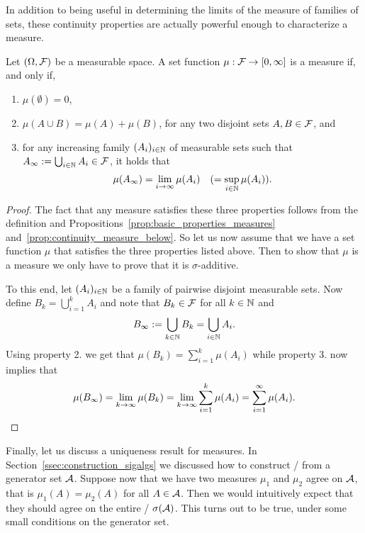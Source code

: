 In addition to being useful in determining the limits of the measure of families of sets, these continuity properties are actually powerful enough to characterize a measure. 

\begin{theorem}
Let $(\Omega, \mathcal F)$ be a measurable space. A set function $\mu : \mathcal F \to [0,\infty]$ is a measure if, and only if,
\begin{enumerate}
\item $\mu(\emptyset) = 0$,
\item $\mu(A \cup B) = \mu(A) + \mu(B)$, for any two disjoint sets $A, B \in \mathcal F$, and
\item for any increasing family $(A_i)_{i \in \mathbb N}$ of measurable sets such that $A_\infty := \bigcup_{i \in \mathbb N} A_i \in \mathcal F$, it holds that
\[
	\mu(A_\infty) = \lim_{i \to \infty} \mu(A_i) \quad (= \sup_{i \in \mathbb N} \mu(A_i)).
\]
\end{enumerate}
\end{theorem}

\begin{proof}
The fact that any measure satisfies these three properties follows from the definition and Propositions~\ref{prop:basic_properties_measures} and~\ref{prop:continuity_measure_below}. So let us now assume that we have a set function $\mu$ that satisfies the three properties listed above. Then to show that $\mu$ is a measure we only have to prove that it is $\sigma$-additive.

To this end, let $(A_i)_{i \in \mathbb N}$ be a family of pairwise disjoint measurable sets. Now define $B_k = \bigcup_{i = 1}^k A_i$ and note that $B_k \in \mathcal F$ for all $k \in \mathbb N$ and
\[
	B_\infty := \bigcup_{k \in \mathbb N} B_k = \bigcup_{i \in \mathbb N} A_i.
\]
Using property 2. we get that $\mu(B_k) = \sum_{i = 1}^k \mu(A_i)$ while property 3. now implies that
\[
	\mu(B_\infty) = \lim_{k \to \infty} \mu(B_k) = \lim_{k \to \infty} \sum_{i = 1}^k \mu(A_i) = \sum_{i = 1}^\infty \mu(A_i). \qedhere
\]
\end{proof}

Finally, let us discuss a uniqueness result for measures. In Section~\ref{ssec:construction_sigalgs} we discussed how to construct \sigalgs/ from a generator set $\mathcal A$. Suppose now that we have two measures $\mu_1$ and $\mu_2$ agree on $\mathcal A$, that is $\mu_1(A) = \mu_2(A)$ for all $A \in \mathcal A$. Then we would intuitively expect that they should agree on the entire \sigalg/ $\sigma(\mathcal A)$. This turns out to be true, under some small conditions on the generator set.

